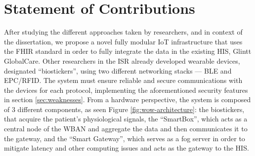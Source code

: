 

\section{Statement of Contributions}

After studying the different approaches taken by researchers, and in context of the dissertation, we propose a novel fully modular \acs{IoT} infrastructure that uses the \acs{FHIR} standard in order to fully integrate the data in the existing \acs{HIS}, Glintt GlobalCare. Other researchers in the \acf{ISR} already developed wearable devices, designated ``biostickers'', using two different networking stacks — \acs{BLE} and \acs{EPC/RFID}. The system must ensure reliable and secure communications with the devices for each protocol, implementing the aforementioned security features in section \ref{sec:weaknesses}. From a hardware perspective, the system is composed of 3 different components, as seen Figure \ref{fig:wow-architecture}: the biostickers, that acquire the patient's physiological signals, the ``SmartBox'', which acts as a central node of the WBAN and aggregate the data and then communicates it to the gateway, and the ``Smart Gateway'', which serves as a fog server in order to mitigate latency and other computing issues and acts as the gateway to the \acs{HIS}. 

